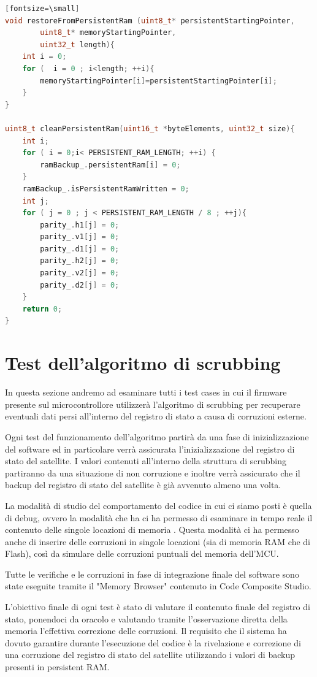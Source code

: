 \documentclass[LaM,binding=0.6cm]{../sapthesis}
\begin{document}
\begin{lstlisting}[language=c][fontsize=\small]
void restoreFromPersistentRam (uint8_t* persistentStartingPointer,
        uint8_t* memoryStartingPointer,
        uint32_t length){
    int i = 0;
    for (  i = 0 ; i<length; ++i){
        memoryStartingPointer[i]=persistentStartingPointer[i];
    }
}

uint8_t cleanPersistentRam(uint16_t *byteElements, uint32_t size){
    int i;
    for ( i = 0;i< PERSISTENT_RAM_LENGTH; ++i) {
        ramBackup_.persistentRam[i] = 0;
    }
    ramBackup_.isPersistentRamWritten = 0;
    int j;
    for ( j = 0 ; j < PERSISTENT_RAM_LENGTH / 8 ; ++j){
        parity_.h1[j] = 0;
        parity_.v1[j] = 0;
        parity_.d1[j] = 0;
        parity_.h2[j] = 0;
        parity_.v2[j] = 0;
        parity_.d2[j] = 0;
    }
    return 0;
}
\end{lstlisting}
\clearpage

\section{Test dell'algoritmo di scrubbing}

In questa sezione andremo ad esaminare tutti i test cases in cui il firmware presente sul microcontrollore utilizzerà l'algoritmo di scrubbing per recuperare eventuali dati persi all'interno del registro di stato a causa di corruzioni esterne.

Ogni test del funzionamento dell'algoritmo partirà da una fase di inizializzazione del software ed in particolare verrà assicurata l'inizializzazione del registro di stato del satellite. I valori contenuti all'interno della struttura di scrubbing partiranno da una situazione di non corruzione e inoltre verrà assicurato che il backup del registro di stato del satellite è già avvenuto almeno una volta.

La modalità di studio del comportamento del codice in cui ci siamo posti è quella di debug, ovvero la modalità che ha ci ha permesso di esaminare in tempo reale il contenuto delle singole locazioni di memoria .
Questa modalità ci ha permesso anche di inserire delle corruzioni in singole locazioni (sia di memoria RAM che di Flash), così da simulare delle corruzioni puntuali del memoria dell'MCU.

Tutte le verifiche e le corruzioni in fase di integrazione finale del software sono state eseguite tramite il "Memory Browser" contenuto in Code Composite Studio.

L'obiettivo finale di ogni test è stato di valutare il contenuto finale del registro di stato, ponendoci da oracolo e valutando tramite l'osservazione diretta della memoria l'effettiva correzione delle corruzioni.\newline\newline
Il requisito che il sistema ha dovuto garantire durante l'esecuzione del codice è la rivelazione e correzione di una corruzione del registro di stato del satellite utilizzando i valori di backup presenti in persistent RAM.
\end{document}
